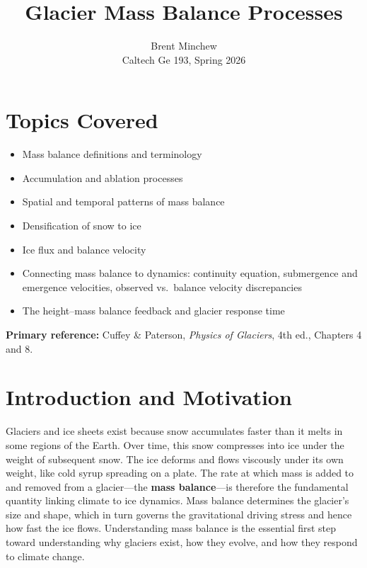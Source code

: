 \documentclass[11pt]{article}
\title{Glacier Mass Balance Processes}
\author{Brent Minchew \\Caltech Ge 193, Spring 2026}
\date{}
\begin{document}
\maketitle

\section*{Topics Covered}

\begin{itemize}
  \item Mass balance definitions and terminology
  \item Accumulation and ablation processes
  \item Spatial and temporal patterns of mass balance
  \item Densification of snow to ice
  \item Ice flux and balance velocity
  \item Connecting mass balance to dynamics: continuity equation, submergence and emergence velocities, observed vs.\ balance velocity discrepancies
  \item The height--mass balance feedback and glacier response time
\end{itemize}

\bigskip
\noindent \textbf{Primary reference:} Cuffey \& Paterson, \textit{Physics of Glaciers}, 4th ed., Chapters 4 and 8.

\section{Introduction and Motivation}

Glaciers and ice sheets exist because snow accumulates faster than it melts in some regions of the Earth.  Over time, this snow compresses into ice under the weight of subsequent snow. The ice deforms and flows viscously under its own weight, like cold syrup spreading on a plate.  The rate at which mass is added to and removed from a glacier---the \textbf{mass balance}---is therefore the fundamental quantity linking climate to ice dynamics.  Mass balance determines the glacier's size and shape, which in turn governs the gravitational driving stress and hence how fast the ice flows.  Understanding mass balance is the essential first step toward understanding why glaciers exist, how they evolve, and how they respond to climate change.
\end{document}
